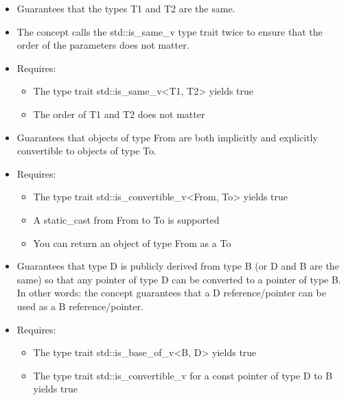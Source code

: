 

\begin{itemize}
\item
Guarantees that the types T1 and T2 are the same.

\item
The concept calls the std::is\_same\_v type trait twice to ensure that the order of the parameters does not matter.

\item
Requires:
\begin{itemize}
\item
The type trait std::is\_same\_v<T1, T2> yields true

\item
The order of T1 and T2 does not matter
\end{itemize}
\end{itemize}


\begin{itemize}
\item
Guarantees that objects of type From are both implicitly and explicitly convertible to objects of type To.

\item
Requires:
\begin{itemize}
\item
The type trait std::is\_convertible\_v<From, To> yields true

\item
A static\_cast from From to To is supported

\item
You can return an object of type From as a To
\end{itemize}
\end{itemize}


\begin{itemize}
\item
Guarantees that type D is publicly derived from type B (or D and B are the same) so that any pointer of type D can be converted to a pointer of type B. In other words: the concept guarantees that a D reference/pointer can be used as a B reference/pointer.

\item
Requires:
\begin{itemize}
\item
The type trait std::is\_base\_of\_v<B, D> yields true

\item
The type trait std::is\_convertible\_v for a const pointer of type D to B yields true
\end{itemize}
\end{itemize}


